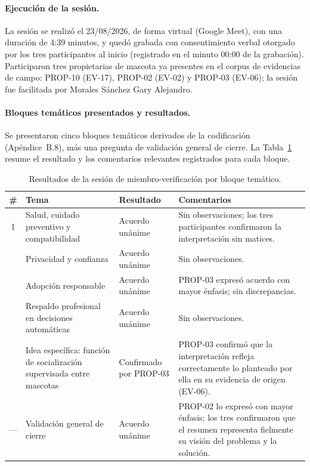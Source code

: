 \documentclass[journal,onecolumn]{IEEEtran}
\begin{document}
	\paragraph{Ejecución de la sesión.}
	La sesión se realizó el 23/08/2026, de forma virtual (Google Meet), con
	una duración de 4:39 minutos, y quedó grabada con consentimiento verbal
	otorgado por los tres participantes al inicio (registrado en el minuto
	00:00 de la grabación). Participaron tres propietarias de mascota ya
	presentes en el corpus de evidencias de campo: PROP-10 (EV-17), PROP-02
	(EV-02) y PROP-03 (EV-06); la sesión fue facilitada por Morales Sánchez
	Gary Alejandro.

	\paragraph{Bloques temáticos presentados y resultados.}
	Se presentaron cinco bloques temáticos derivados de la codificación
	(Apéndice~B.8), más una pregunta de validación general de cierre. La
	Tabla~\ref{tab:memberchecking} resume el resultado y los comentarios
	relevantes registrados para cada bloque.

	\begin{table}[H]
		\centering
		\small
		\caption{Resultados de la sesión de miembro-verificación por bloque temático.}
		\label{tab:memberchecking}
		\begin{tabularx}{\textwidth}{@{}c p{3.4cm} p{2.6cm} X@{}}
			\toprule
			\textbf{\#} & \textbf{Tema} & \textbf{Resultado} & \textbf{Comentarios} \\
			\midrule
			1 & Salud, cuidado preventivo y compatibilidad & Acuerdo unánime & Sin observaciones; los tres participantes confirmaron la interpretación sin matices. \\
			\addlinespace
			2 & Privacidad y confianza & Acuerdo unánime & Sin observaciones. \\
			\addlinespace
			3 & Adopción responsable & Acuerdo unánime & PROP-03 expresó acuerdo con mayor énfasis; sin discrepancias. \\
			\addlinespace
			4 & Respaldo profesional en decisiones automáticas & Acuerdo unánime & Sin observaciones. \\
			\addlinespace
			5 & Idea específica: función de socialización supervisada entre mascotas & Confirmado por PROP-03 & PROP-03 confirmó que la interpretación refleja correctamente lo planteado por ella en su evidencia de origen (EV-06). \\
			\addlinespace
			--- & Validación general de cierre & Acuerdo unánime & PROP-02 lo expresó con mayor énfasis; los tres confirmaron que el resumen representa fielmente su visión del problema y la solución. \\
			\bottomrule
		\end{tabularx}
	\end{table}
\end{document}
